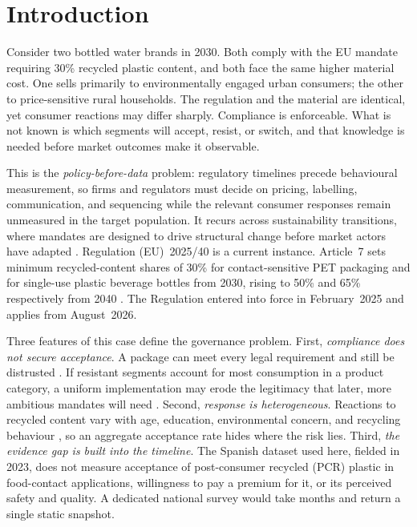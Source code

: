 \section{Introduction}
\label{sec:intro}

Consider two bottled water brands in 2030. Both comply with the EU mandate
requiring 30\% recycled plastic content, and both face the same higher material
cost. One sells primarily to environmentally engaged urban consumers; the other
to price-sensitive rural households. The regulation and the material are
identical, yet consumer reactions may differ sharply. Compliance is
enforceable. What is not known is which segments will accept, resist, or
switch, and that knowledge is needed before market outcomes make it observable.

This is the \emph{policy-before-data} problem: regulatory timelines precede
behavioural measurement, so firms and regulators must decide on pricing,
labelling, communication, and sequencing while the relevant consumer responses
remain unmeasured in the target population. It recurs across sustainability
transitions, where mandates are designed to drive structural change before
market actors have adapted \citep{mao2020}. Regulation (EU)~2025/40 is a current
instance. Article~7 sets minimum recycled-content shares of 30\% for
contact-sensitive PET packaging and for single-use plastic beverage bottles
from 2030, rising to 50\% and 65\% respectively from 2040 \citep{eu2025}. The
Regulation entered into force in February~2025 and applies from August~2026.

Three features of this case define the governance problem. First,
\emph{compliance does not secure acceptance}. A package can meet every legal
requirement and still be distrusted \citep{polyportis2022}. If resistant
segments account for most consumption in a product category, a uniform
implementation may erode the legitimacy that later, more ambitious mandates
will need \citep{molenbuur2025}. Second, \emph{response is heterogeneous}.
Reactions to recycled content vary with age, education, environmental concern,
and recycling behaviour \citep{ruokamo2022,zwicker2020}, so an aggregate
acceptance rate hides where the risk lies. Third, \emph{the evidence gap is
built into the timeline}. The Spanish dataset used here, fielded in 2023, does
not measure acceptance of post-consumer recycled (PCR) plastic in food-contact
applications, willingness to pay a premium for it, or its perceived safety and
quality. A dedicated national survey would take months and return a single
static snapshot.

